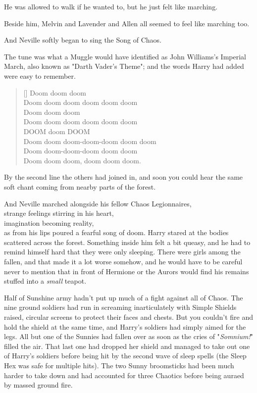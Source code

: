 He was allowed to walk if he wanted to, but he just felt like marching.

Beside him, Melvin and Lavender and Allen all seemed to feel like marching too.

And Neville softly began to sing the Song of Chaos.

The tune was what a Muggle would have identified as John Williams's Imperial
March, also known as "Darth Vader's Theme"; and the words Harry had added were
easy to remember.

\baselineskip\relax
\settowidth{\versewidth}{Doom doom doom-doom-doom doom doom}
\begin{verse}[\versewidth]
Doom doom doom\\
Doom doom doom doom doom doom\\
Doom doom doom\\
Doom doom doom doom doom doom\\
DOOM doom DOOM\\
Doom doom doom-doom-doom doom doom\\
Doom doom-doom-doom doom doom\\
Doom doom doom, doom doom doom.
\end{verse}
\baselineskip\relax

By the second line the others had joined in, and soon you could hear the same
soft chant coming from nearby parts of the forest.

\baselineskip\relax
\noindent
And Neville marched alongside his fellow Chaos Legionnaires,\\
strange feelings stirring in his heart,\\
imagination becoming reality,\\
as from his lips poured a fearful song of doom.
\sbreak
Harry stared at the bodies scattered across the forest. Something inside him
felt a bit queasy, and he had to remind himself hard that they were only
sleeping. There were girls among the fallen, and that made it a lot worse
somehow, and he would have to be careful never to mention that in front of
Hermione or the Aurors would find his remains stuffed into a \emph{small}
teapot.
\pagebreak

Half of Sunshine army hadn't put up much of a fight against all of Chaos. The
nine ground soldiers had run in screaming inarticulately with Simple Shields
raised, circular screens to protect their faces and chests. But you couldn't
fire and hold the shield at the same time, and Harry's soldiers had simply
aimed for the legs. All but one of the Sunnies had fallen over as soon as the
cries of "\emph{Somnium!}" filled the air. That last one had dropped her shield
and managed to take out one of Harry's soldiers before being hit by the second
wave of sleep spells (the Sleep Hex was safe for multiple hits). The two Sunny
broomsticks had been much harder to take down and had accounted for three
Chaotics before being auraed by massed ground fire.


